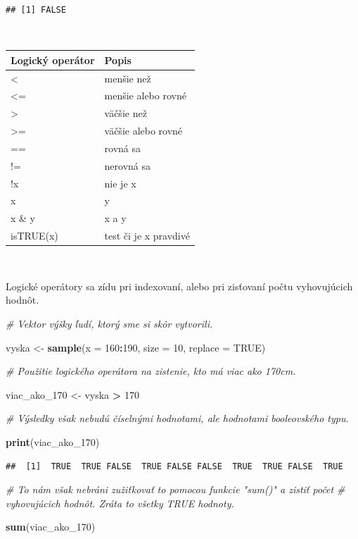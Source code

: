 \documentclass[]{article}
\newenvironment{Shaded}{\begin{snugshade}}{\end{snugshade}}
\newcommand{\CommentTok}[1]{\textcolor[rgb]{0.56,0.35,0.01}{\textit{#1}}}
\newcommand{\DataTypeTok}[1]{\textcolor[rgb]{0.13,0.29,0.53}{#1}}
\newcommand{\DecValTok}[1]{\textcolor[rgb]{0.00,0.00,0.81}{#1}}
\newcommand{\KeywordTok}[1]{\textcolor[rgb]{0.13,0.29,0.53}{\textbf{#1}}}
\newcommand{\NormalTok}[1]{#1}
\newcommand{\OperatorTok}[1]{\textcolor[rgb]{0.81,0.36,0.00}{\textbf{#1}}}
\newcommand{\OtherTok}[1]{\textcolor[rgb]{0.56,0.35,0.01}{#1}}
\newcommand{\StringTok}[1]{\textcolor[rgb]{0.31,0.60,0.02}{#1}}
\begin{document}
\begin{verbatim}
## [1] FALSE
\end{verbatim}

~

\begin{longtable}[]{@{}ll@{}}
\toprule
Logický operátor & Popis\tabularnewline
\midrule
\endhead
\textless{} & menšie než\tabularnewline
\textless= & menšie alebo rovné\tabularnewline
\textgreater{} & väčšie než\tabularnewline
\textgreater= & väčšie alebo rovné\tabularnewline
== & rovná sa\tabularnewline
!= & nerovná sa\tabularnewline
!x & nie je x\tabularnewline
x & y\tabularnewline
x \& y & x a y\tabularnewline
isTRUE(x) & test či je x pravdivé\tabularnewline
\bottomrule
\end{longtable}

~

Logické operátory sa zídu pri indexovaní, alebo pri zisťovaní počtu
vyhovujúcich hodnôt.

\begin{Shaded}
\begin{Highlighting}[]
\CommentTok{# Vektor výšky ľudí, ktorý sme si skôr vytvorili.}

\NormalTok{vyska <-}\StringTok{ }\KeywordTok{sample}\NormalTok{(}\DataTypeTok{x =} \DecValTok{160}\OperatorTok{:}\DecValTok{190}\NormalTok{, }\DataTypeTok{size =} \DecValTok{10}\NormalTok{, }\DataTypeTok{replace =} \OtherTok{TRUE}\NormalTok{)}

\CommentTok{# Použitie logického operátora na zistenie, kto má viac ako 170cm. }

\NormalTok{viac_ako_}\DecValTok{170}\NormalTok{ <-}\StringTok{ }\NormalTok{vyska }\OperatorTok{>}\StringTok{ }\DecValTok{170}

\CommentTok{# Výsledky však nebudú číselnými hodnotami, ale hodnotami booleovského typu.}

\KeywordTok{print}\NormalTok{(viac_ako_}\DecValTok{170}\NormalTok{)}
\end{Highlighting}
\end{Shaded}

\begin{verbatim}
##  [1]  TRUE  TRUE FALSE  TRUE FALSE FALSE  TRUE  TRUE FALSE  TRUE
\end{verbatim}

\begin{Shaded}
\begin{Highlighting}[]
\CommentTok{# To nám však nebráni zužiťkovať to pomocou funkcie "sum()" a zistiť počet }
\CommentTok{# vyhovujúcich hodnôt. Zráta to všetky TRUE hodnoty.}

\KeywordTok{sum}\NormalTok{(viac_ako_}\DecValTok{170}\NormalTok{)}
\end{Highlighting}
\end{Shaded}
\end{document}
